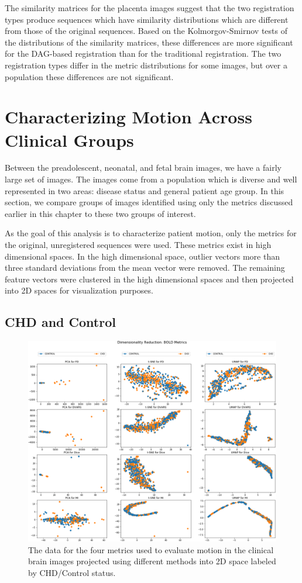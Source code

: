 The similarity matrices for the placenta images suggest that the two registration types produce sequences which have similarity distributions which are different from those of the original sequences. Based on the Kolmorgov-Smirnov tests of the distributions of the similarity matrices, these differences are more significant for the DAG-based registration than for the traditional registration. The two registration types differ in the metric distributions for some images, but over a population these differences are not significant.

\section{Characterizing Motion Across Clinical Groups}

Between the preadolescent, neonatal, and fetal brain images, we have a fairly large set of images. The images come from a population which is diverse and well represented in two areas: disease status and general patient age group. In this section, we compare groups of images identified using only the metrics discussed earlier in this chapter to these two groups of interest. 

As the goal of this analysis is to characterize patient motion, only the metrics for the original, unregistered sequences were used. These metrics exist in high dimensional spaces. In the high dimensional space, outlier vectors more than three standard deviations from the mean vector were removed. The remaining feature vectors were clustered in the high dimensional spaces and then projected into 2D spaces for visualization purposes.

\subsection{CHD and Control}

\begin{figure}
\centering
\includegraphics[width=1.0\textwidth]{6/figures/bold-2d-all-cohort.png}
\caption{The data for the four metrics used to evaluate motion in the clinical brain images projected using different methods into 2D space labeled by CHD/Control status.}
\label{fig:mocha-cohorts-data-2d}
\end{figure}


